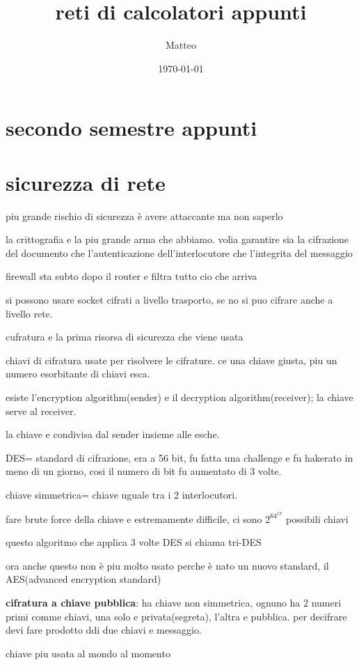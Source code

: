\documentclass[12pt]{article}
\title{reti di calcolatori appunti}
\author{Matteo}
\date{\today}
\begin{document}
\maketitle
\section{secondo semestre appunti}
\section{sicurezza  di rete}
piu grande rischio di sicurezza è avere attaccante ma non saperlo

la crittografia e la piu grande arma che abbiamo.
volia garantire sia la cifrazione del documento che l'autenticazione dell'interlocutore che l'integrita del messaggio

firewall sta subto dopo il router e filtra tutto cio che arriva

si possono usare socket cifrati a livello trasporto, se no si puo cifrare anche a livello rete.

cufratura e la prima risorsa di sicurezza che viene usata

chiavi di cifratura usate per risolvere le cifrature. ce una chiave giusta, piu un numero esorbitante di chiavi esca.

esiste l'encryption algorithm(sender) e il decryption algorithm(receiver); la chiave serve al receiver.

la chiave e condivisa dal sender insieme alle esche.

DES= standard di cifrazione, era a 56 bit, fu fatta una challenge e fu hakerato in meno di un giorno, cosi il numero di bit fu aumentato di 3 volte.

chiave simmetrica= chiave uguale tra i 2 interlocutori.

fare brute force della chiave e estremamente difficile, ci sono $2^64^17$ possibili chiavi

questo algoritmo che applica 3 volte DES si chiama tri-DES

ora anche questo non è piu molto usato perche è nato un nuovo standard, il AES(advanced encryption standard)

\textbf{cifratura a chiave pubblica}: ha chiave non simmetrica, ognuno ha 2 numeri primi comme chiavi, una solo e privata(segreta), l'altra e pubblica. per decifrare devi fare prodotto ddi due chiavi e messaggio.

chiave piu usata al mondo al momento
\end{document}
